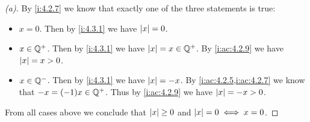 \begin{proof}[(a)]
  By \cref{i:4.2.7} we know that exactly one of the three statements is true:
  \begin{itemize}
    \item \(x = 0\).
          Then by \cref{i:4.3.1} we have \(\left\lvert x\right\rvert = 0\).
    \item \(x \in \mathbb{Q}^+\).
          Then by \cref{i:4.3.1} we have \(\left\lvert x\right\rvert = x \in \mathbb{Q}^+\).
          By \cref{i:ac:4.2.9} we have \(\left\lvert x\right\rvert = x > 0\).
    \item \(x \in \mathbb{Q}^-\).
          Then by \cref{i:4.3.1} we have \(\left\lvert x\right\rvert = -x\).
          By \cref{i:ac:4.2.5,i:ac:4.2.7} we know that \(-x = (-1)x \in \mathbb{Q}^+\).
          Thus by \cref{i:ac:4.2.9} we have \(\left\lvert x\right\rvert = -x > 0\).
  \end{itemize}
  From all cases above we conclude that \(\left\lvert x\right\rvert \geq 0\) and \(\left\lvert x\right\rvert = 0 \iff x = 0\).
\end{proof}

